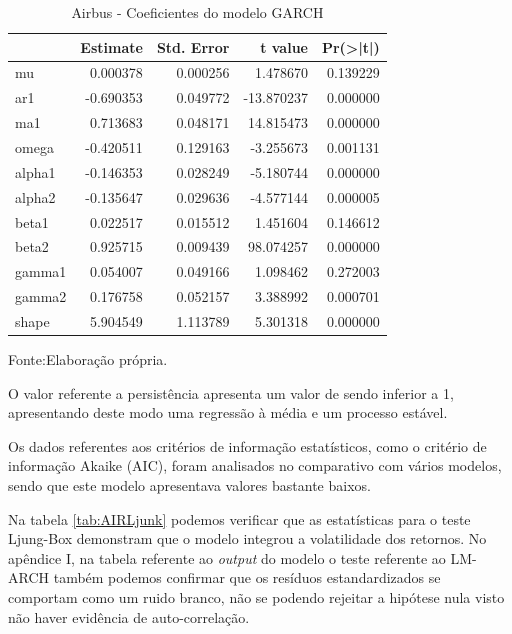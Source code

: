 \documentclass[
  12pt,
  a4paper,
  openany]{book}
\theoremstyle{definition}
\theoremstyle{definition}
\theoremstyle{definition}
\theoremstyle{remark}
\begin{document}
\normalsize

\begin{table}[!h]

\caption{\label{tab:AIRcoefk}Airbus - Coeficientes do modelo GARCH}
\centering
\begin{tabular}[t]{lrrrr}
\toprule
  &  Estimate &  Std. Error &  t value & Pr(>|t|)\\
\midrule
mu & 0.000378 & 0.000256 & 1.478670 & 0.139229\\
ar1 & -0.690353 & 0.049772 & -13.870237 & 0.000000\\
ma1 & 0.713683 & 0.048171 & 14.815473 & 0.000000\\
omega & -0.420511 & 0.129163 & -3.255673 & 0.001131\\
alpha1 & -0.146353 & 0.028249 & -5.180744 & 0.000000\\
\addlinespace
alpha2 & -0.135647 & 0.029636 & -4.577144 & 0.000005\\
beta1 & 0.022517 & 0.015512 & 1.451604 & 0.146612\\
beta2 & 0.925715 & 0.009439 & 98.074257 & 0.000000\\
gamma1 & 0.054007 & 0.049166 & 1.098462 & 0.272003\\
gamma2 & 0.176758 & 0.052157 & 3.388992 & 0.000701\\
\addlinespace
shape & 5.904549 & 1.113789 & 5.301318 & 0.000000\\
\bottomrule
\end{tabular}
\end{table}
\FloatBarrier
\centering

Fonte:Elaboração própria.

\justifying
\bigskip

O valor referente a persistência apresenta um valor de sendo inferior a 1, apresentando deste modo uma regressão à média e um processo estável.

Os dados referentes aos critérios de informação estatísticos, como o critério de informação Akaike (AIC), foram analisados no comparativo com vários modelos, sendo que este modelo apresentava valores bastante baixos.

Na tabela \ref{tab:AIRLjunk} podemos verificar que as estatísticas para o teste Ljung-Box demonstram que o modelo integrou a volatilidade dos retornos. No apêndice I, na tabela referente ao \emph{output} do modelo o teste referente ao LM-ARCH também podemos confirmar que os resíduos estandardizados se comportam como um ruido branco, não se podendo rejeitar a hipótese nula visto não haver evidência de auto-correlação.
\end{document}

